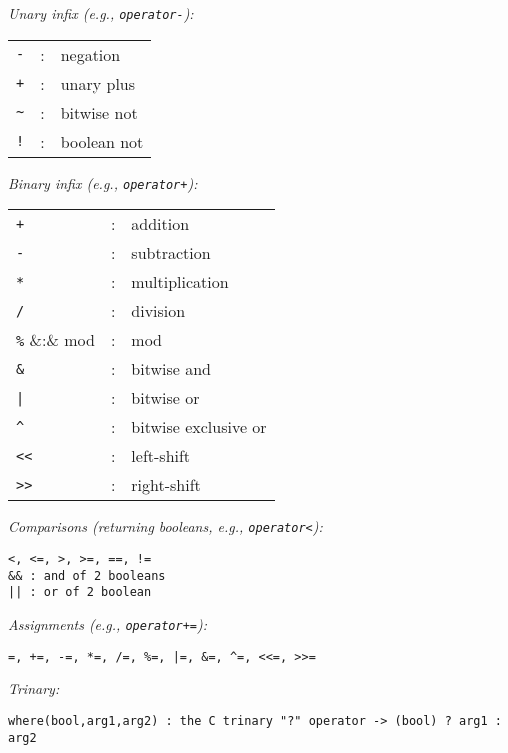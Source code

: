 \documentclass[12pt,letterpaper]{article}
\begin{document}
\noindent
{\em Unary infix (e.g., {\tt operator-}):}

\begin{flushleft}
\begin{tabular}{lcp{4.0in}}
\verb|-| &: & negation\\
\verb|+| &: & unary plus\\
\verb|~| &: & bitwise not\\
\verb|!| &: & boolean not\\
\end{tabular}
\end{flushleft}

\noindent
{\em Binary infix (e.g., {\tt operator+}):}

\begin{flushleft}
\begin{tabular}{lcp{4.0in}}
\verb|+|  &:& addition\\
\verb|-|  &:& subtraction\\
\verb|*|  &:& multiplication\\
\verb|/|  &:& division\\
\verb|%|  &:& mod\\
\verb|&|  &:& bitwise and\\
{\tt |}  &:& bitwise or\\
\verb|^|  &:& bitwise exclusive or\\
\verb|<<| &:& left-shift\\
\verb|>>| &:& right-shift\\
\end{tabular}
\end{flushleft}

\noindent
{\em Comparisons (returning booleans, e.g., {\tt operator<}):}

\begin{verbatim}
<, <=, >, >=, ==, !=
&& : and of 2 booleans
|| : or of 2 boolean
\end{verbatim}


\noindent
{\em Assignments (e.g., {\tt operator+=}):}

\begin{verbatim}
=, +=, -=, *=, /=, %=, |=, &=, ^=, <<=, >>=
\end{verbatim}

\noindent
{\em Trinary:}

\begin{verbatim}
where(bool,arg1,arg2) : the C trinary "?" operator -> (bool) ? arg1 : arg2
\end{verbatim}
\end{document}
